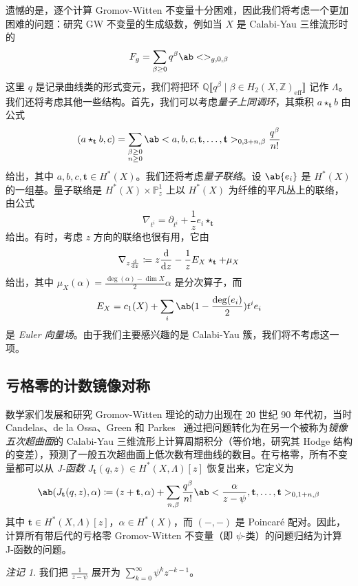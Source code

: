 \documentclass{amsart}
\theoremstyle{definition}
\theoremstyle{remark}
\newtheorem{rmk}[thm]{注记}
\theoremstyle{plain}
\theoremstyle{definition}
\theoremstyle{remark}
\newcommand{\Z}{\mathbb{Z}}
\newcommand{\Q}{\mathbb{Q}}
\renewcommand{\P}{\mathbb{P}}
\newcommand{\mbf}[1]{\mathbf{#1}}
\newcommand{\mr}[1]{\mathrm{#1}}
\newcommand{\1}{\mathbf{1}}
\newcommand{\2}{\mathbf{2}}
\newcommand{\3}{\mathbf{3}}
\newcommand{\ps}[1]{\llbracket #1 \rrbracket}
\begin{document}
遗憾的是，逐个计算 Gromov-Witten 不变量十分困难，因此我们将考虑一个更加困难的问题：研究 GW 不变量的生成级数，例如当 \(X\) 是 Calabi-Yau 三维流形时的
\[ F_g = \sum_{\beta \geq 0} q^{\beta} \ab<>_{g,0,\beta} \]
这里 \(q\) 是记录曲线类的形式变元，我们将把环 \(\Q\ps{q^{\beta} \mid \beta \in H_2(X, \Z)_{\mr{eff}}}\) 记作 \(\Lambda\)。我们还将考虑其他一些结构。首先，我们可以考虑\textit{量子上同调环}，其乘积 \(a \star_{\mbf{t}} b\) 由公式
\[
    (a \star_{\mbf{t}} b, c) = \sum_{\substack{\beta \geq 0 \\ n \geq 0}} \ab<a,b,c, \mbf{t}, \ldots, \mbf{t}>_{0,3+n,\beta} \frac{q^{\beta}}{n!}
\]
给出，其中 \(a,b,c, \mbf{t} \in H^*(X)\)。我们还将考虑\textit{量子联络}。设 \(\ab\{ e_i \}\) 是 \(H^*(X)\) 的一组基。量子联络是 \(H^*(X) \times \P^1_z\) 上以 \(H^*(X)\) 为纤维的平凡丛上的联络，由公式
\[ \nabla_{t^i} = \partial_{t^i} + \frac{1}{z} e_i \star_{\mbf{t}} \]
给出。有时，考虑 \(z\) 方向的联络也很有用，它由
\[ \nabla_{z \odv{}{z}} \coloneqq z \odv{}{z} - \frac{1}{z} E_X \star_{\mbf{t}} + \mu_X \]
给出，其中 \(\mu_X(\alpha) = \frac{\deg(\alpha) - \dim X}{2} \alpha\) 是分次算子，而
\[ E_X = c_1(X) + \sum_i \ab(1 - \frac{\deg(e_i)}{2})t^i e_i \]
是 \textit{Euler 向量场}。由于我们主要感兴趣的是 Calabi-Yau 簇，我们将不考虑这一项。

\subsection{亏格零的计数镜像对称}%
\label{sub:Enumerative mirror symmetry in genus zero}

数学家们发展和研究 Gromov-Witten 理论的动力出现在 20 世纪 90 年代初，当时 Candelas、de la Ossa、Green 和 Parkes~\cite{CandelasEtAl1991} 通过把问题转化为在另一个被称为\textit{镜像五次超曲面}的 Calabi-Yau 三维流形上计算周期积分（等价地，研究其 Hodge 结构的变差），预测了一般五次超曲面上低次数有理曲线的数目。在亏格零，所有不变量都可以从 \textit{J-函数} \(J_{\mbf{t}}(q,z) \in H^*(X, \Lambda)[z]\) 恢复出来，它定义为
\[ \ab( J_{\mbf{t}}(q, z), \alpha ) \coloneqq (z + \mbf{t}, \alpha) + \sum_{n, \beta} \frac{q^{\beta}}{n!} \ab< \frac{\alpha}{z-\psi}, \mbf{t}, \ldots, \mbf{t}>_{0,1+n, \beta} \]
其中 \(\mbf{t} \in H^*(X, \Lambda)[z]\)，\(\alpha \in H^*(X)\)，而 \((-,-)\) 是 Poincar\'e 配对。因此，计算所有带后代的亏格零 Gromov-Witten 不变量（即 \(\psi\)-类）的问题归结为计算 J-函数的问题。

\begin{rmk}
    我们把 \(\frac{1}{z-\psi}\) 展开为 \(\sum_{k=0}^{\infty} \psi^k z^{-k-1}\)。
\end{rmk}
\end{document}
